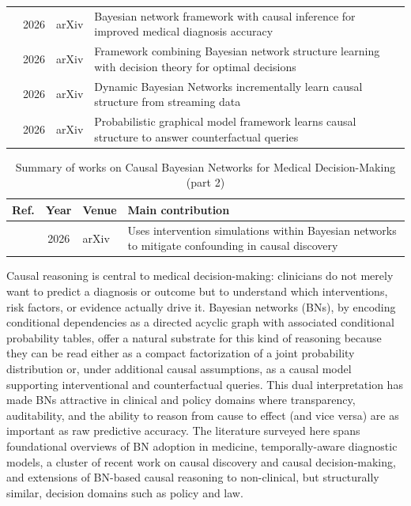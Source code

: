 \begin{table}[!t]
\begin{tabularx}{\textwidth}{@{}l c p{3.6cm} X@{}}
\cite{zhang2026bayesian} & 2026 & arXiv & Bayesian network framework with causal inference for improved medical diagnosis accuracy \\
\cite{zhang2026causalg} & 2026 & arXiv & Framework combining Bayesian network structure learning with decision theory for optimal decisions \\
\cite{zhang2026dynamic} & 2026 & arXiv & Dynamic Bayesian Networks incrementally learn causal structure from streaming data \\
\cite{zhang2026causalh} & 2026 & arXiv & Probabilistic graphical model framework learns causal structure to answer counterfactual queries \\
\bottomrule
\end{tabularx}
\end{table}

\begin{table}[!t]
\centering
\renewcommand{\arraystretch}{1.2}
\caption{Summary of works on Causal Bayesian Networks for Medical Decision-Making (part 2)}
\begin{tabularx}{\textwidth}{@{}l c p{3.6cm} X@{}}
\toprule
\textbf{Ref.} & \textbf{Year} & \textbf{Venue} & \textbf{Main contribution} \\
\midrule
\cite{zhang2026causaln} & 2026 & arXiv & Uses intervention simulations within Bayesian networks to mitigate confounding in causal discovery \\
\bottomrule
\end{tabularx}
\end{table}

Causal reasoning is central to medical decision-making: clinicians do not merely want to predict a diagnosis or outcome but to understand which interventions, risk factors, or evidence actually drive it. Bayesian networks (BNs), by encoding conditional dependencies as a directed acyclic graph with associated conditional probability tables, offer a natural substrate for this kind of reasoning because they can be read either as a compact factorization of a joint probability distribution or, under additional causal assumptions, as a causal model supporting interventional and counterfactual queries. This dual interpretation has made BNs attractive in clinical and policy domains where transparency, auditability, and the ability to reason from cause to effect (and vice versa) are as important as raw predictive accuracy. The literature surveyed here spans foundational overviews of BN adoption in medicine, temporally-aware diagnostic models, a cluster of recent work on causal discovery and causal decision-making, and extensions of BN-based causal reasoning to non-clinical, but structurally similar, decision domains such as policy and law.


